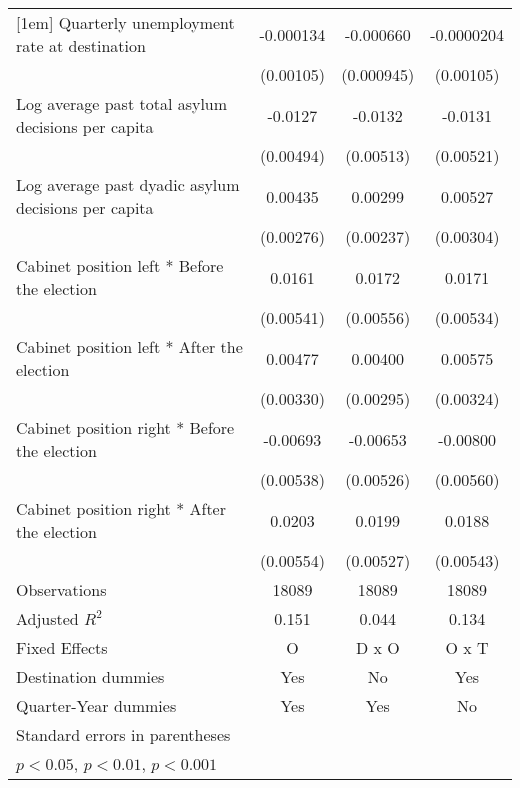 \begin{table}[htbp]
\begin{tabular}{l*{3}{c}}
[1em]
Quarterly unemployment rate at destination&   -0.000134         &   -0.000660         &  -0.0000204         \\
                    &   (0.00105)         &  (0.000945)         &   (0.00105)         \\
[1em]
Log average past total asylum decisions per capita&     -0.0127\sym{*}  &     -0.0132\sym{*}  &     -0.0131\sym{*}  \\
                    &   (0.00494)         &   (0.00513)         &   (0.00521)         \\
[1em]
Log average past dyadic asylum decisions per capita&     0.00435         &     0.00299         &     0.00527         \\
                    &   (0.00276)         &   (0.00237)         &   (0.00304)         \\
[1em]
Cabinet position left * Before the election&      0.0161\sym{**} &      0.0172\sym{**} &      0.0171\sym{**} \\
                    &   (0.00541)         &   (0.00556)         &   (0.00534)         \\
[1em]
Cabinet position left * After the election&     0.00477         &     0.00400         &     0.00575         \\
                    &   (0.00330)         &   (0.00295)         &   (0.00324)         \\
[1em]
Cabinet position right * Before the election&    -0.00693         &    -0.00653         &    -0.00800         \\
                    &   (0.00538)         &   (0.00526)         &   (0.00560)         \\
[1em]
Cabinet position right * After the election&      0.0203\sym{***}&      0.0199\sym{***}&      0.0188\sym{**} \\
                    &   (0.00554)         &   (0.00527)         &   (0.00543)         \\
\hline
Observations        &       18089         &       18089         &       18089         \\
Adjusted \(R^{2}\)  &       0.151         &       0.044         &       0.134         \\
Fixed Effects       &           O         &       D x O         &       O x T         \\
Destination dummies &         Yes         &          No         &         Yes         \\
Quarter-Year dummies&         Yes         &         Yes         &          No         \\
\hline\hline
\multicolumn{4}{l}{\footnotesize Standard errors in parentheses}\\
\multicolumn{4}{l}{\footnotesize \sym{*} \(p<0.05\), \sym{**} \(p<0.01\), \sym{***} \(p<0.001\)}\\
\end{tabular}
\end{table}
